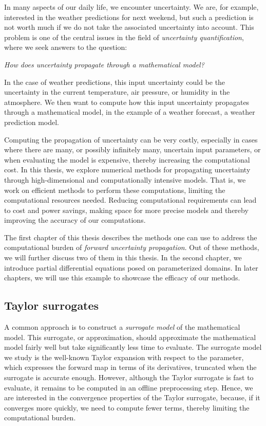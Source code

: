 In many aspects of our daily life, we encounter uncertainty.
We are, for example, interested in the weather predictions for next weekend, but such a prediction is not worth much if we do not take the associated uncertainty into account.
This problem is one of the central issues in the field of \emph{uncertainty quantification}, where we seek answers to the question:
\begin{center}
    \textit{How does uncertainty propagate through a mathematical model?}
\end{center}
In the case of weather predictions, this input uncertainty could be the uncertainty in the current temperature, air pressure, or humidity in the atmosphere.
We then want to compute how this input uncertainty propagates through a mathematical model, in the example of a weather forecast, a weather prediction model.

Computing the propagation of uncertainty can be very costly, especially in cases where there are many, or possibly infinitely many, uncertain input parameters, or when evaluating the model is expensive, thereby increasing the computational cost.
In this thesis, we explore numerical methods for propagating uncertainty through high-dimensional and computationally intensive models.
That is, we work on efficient methods to perform these computations, limiting the computational resources needed.
Reducing computational requirements can lead to cost and power savings, making space for more precise models and thereby improving the accuracy of our computations.

The first chapter of this thesis describes the methods one can use to address the computational burden of \emph{forward uncertainty propagation}.
Out of these methods, we will further discuss two of them in this thesis.
In the second chapter, we introduce partial differential equations posed on parameterized domains.
In later chapters, we will use this example to showcase the efficacy of our methods.

\subsection*{Taylor surrogates}\label{subsec:taylor-surrogates}
A common approach is to construct a \emph{surrogate model} of the mathematical model.
This surrogate, or approximation, should approximate the mathematical model fairly well but take significantly less time to evaluate.
The surrogate model we study is the well-known Taylor expansion with respect to the parameter, which expresses the forward map in terms of its derivatives, truncated when the surrogate is accurate enough.
However, although the Taylor surrogate is fast to evaluate, it remains to be computed in an offline preprocessing step.
Hence, we are interested in the convergence properties of the Taylor surrogate, because, if it converges more quickly, we need to compute fewer terms, thereby limiting the computational burden.

